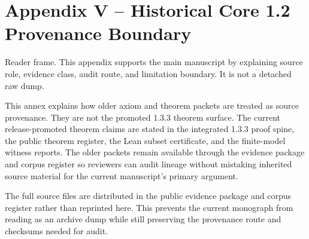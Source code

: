 \section{Appendix V -- Historical Core 1.2 Provenance Boundary}
Reader frame. This appendix supports the main manuscript by explaining source role, evidence class, audit route, and limitation boundary. It is not a detached raw dump.

\label{app:historical-core-12-provenance-annex}

This annex explains how older axiom and theorem packets are treated as source
provenance. They are not the promoted 1.3.3 theorem surface. The current
release-promoted theorem claims are stated in the integrated 1.3.3 proof spine,
the public theorem register, the Lean subset certificate, and the finite-model
witness reports. The older packets remain available through the evidence
package and corpus register so reviewers can audit lineage without mistaking
inherited source material for the current manuscript's primary argument.

The full source files are distributed in the public evidence package and corpus
register rather than reprinted here. This prevents the current monograph from
reading as an archive dump while still preserving the provenance route and
checksums needed for audit.
